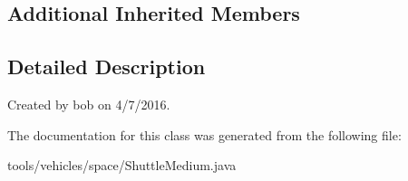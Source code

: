 \subsection*{Additional Inherited Members}


\subsection{Detailed Description}
Created by bob on 4/7/2016. 

The documentation for this class was generated from the following file\+:\begin{DoxyCompactItemize}
\item 
tools/vehicles/space/Shuttle\+Medium.\+java\end{DoxyCompactItemize}
